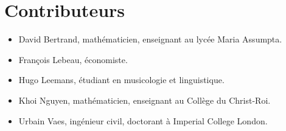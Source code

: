 \section*{Contributeurs}

\begin{itemize}
    \item David Bertrand, mathématicien, enseignant au lycée Maria Assumpta.
    \item François Lebeau, économiste.
    \item Hugo Leemans, étudiant en musicologie et linguistique.
    \item Khoi Nguyen, mathématicien, enseignant au Collège du Christ-Roi.
    \item Urbain Vaes, ingénieur civil, doctorant à Imperial College London.
\end{itemize}

